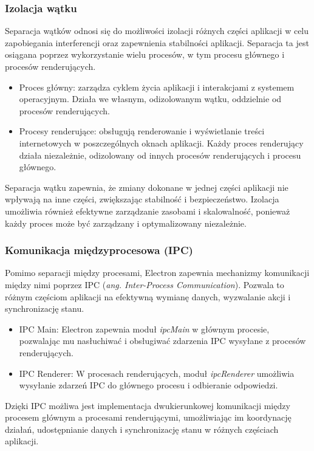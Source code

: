 \documentclass[12pt,a4paper,twoside]{article}
\begin{document}
\subsubsection*{Izolacja wątku}
Separacja wątków odnosi się do możliwości izolacji różnych części aplikacji w celu zapobiegania interferencji oraz zapewnienia stabilności aplikacji. Separacja ta jest osiągana poprzez wykorzystanie wielu procesów, w tym procesu głównego i procesów renderujących.
\begin{itemize}
	\item Proces główny: zarządza cyklem życia aplikacji i interakcjami z systemem operacyjnym. Działa we własnym, odizolowanym wątku, oddzielnie od procesów renderujących.
	\item Procesy renderujące: obsługują renderowanie i wyświetlanie treści internetowych w poszczególnych oknach aplikacji. Każdy proces renderujący działa niezależnie, odizolowany od innych procesów renderujących i procesu głównego.
\end{itemize}
Separacja wątku zapewnia, że zmiany dokonane w jednej części aplikacji nie wpływają na inne części, zwiększając stabilność i bezpieczeństwo. Izolacja umożliwia również efektywne zarządzanie zasobami i skalowalność, ponieważ każdy proces może być zarządzany i optymalizowany niezależnie.
\subsubsection*{Komunikacja międzyprocesowa (IPC)}
Pomimo separacji między procesami, Electron zapewnia mechanizmy komunikacji między nimi poprzez IPC (\textit{ang. Inter-Process Communication}). Pozwala to różnym częściom aplikacji na efektywną wymianę danych, wyzwalanie akcji i synchronizację stanu.
\begin{itemize}
	\item IPC Main: Electron zapewnia moduł \textit{ipcMain} w głównym procesie, pozwalając mu nasłuchiwać i obsługiwać zdarzenia IPC wysyłane z procesów renderujących.
	\item IPC Renderer: W procesach renderujących, moduł \textit{ipcRenderer}	 umożliwia wysyłanie zdarzeń IPC do głównego procesu i odbieranie odpowiedzi.
\end{itemize}
Dzięki IPC możliwa jest implementacja dwukierunkowej komunikacji między procesem głównym a procesami renderującymi, umożliwiając im koordynację działań, udostępnianie danych i synchronizację stanu w różnych częściach aplikacji.\par
\newpage
\end{document}
